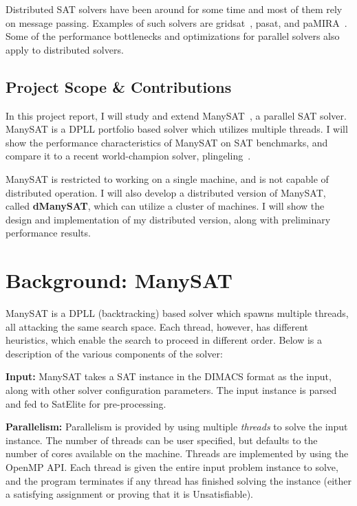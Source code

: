 \documentclass{article}
\begin{document}
Distributed SAT solvers have been around for some time and most of
them rely on message passing. Examples of such solvers are
gridsat~\cite{chrabakh2003gridsat}, pasat, and
paMIRA~\cite{schubert2005pamira}. Some of the performance bottlenecks
and optimizations for parallel solvers also apply to distributed
solvers.


\subsection{Project Scope \& Contributions}

In this project report, I will study and extend
ManySAT~\cite{manysat}, a parallel SAT solver. ManySAT is a
DPLL portfolio based solver which utilizes multiple threads. I will
show the performance characteristics of ManySAT on SAT benchmarks, and
compare it to a recent world-champion solver,
plingeling~\cite{plingeling}.


ManySAT is restricted to working on a single machine, and is not
capable of distributed operation. I will also develop a distributed
version of ManySAT, called \textbf{dManySAT}, which can utilize a cluster of
machines. I will show the design and implementation of my distributed
version, along with preliminary performance results.


\section{Background: ManySAT}

ManySAT is a DPLL (backtracking) based solver which spawns multiple
threads, all attacking the same search space. Each thread, however,
has different heuristics, which enable the search to proceed in
different order. Below is a description of the various components of the solver:

\textbf{Input: } ManySAT takes a SAT instance in the DIMACS format as
the input, along with other solver configuration parameters. The input
instance is parsed and fed to SatElite for pre-processing.


\textbf{Parallelism: } Parallelism is provided by using multiple
\emph{threads} to solve the input instance. The number of threads can
be user specified, but defaults to the number of cores available on
the machine. Threads are implemented by using the OpenMP API. Each
thread is given the entire input problem instance to solve, and the
program terminates if any thread has finished solving the instance
(either a satisfying assignment or proving that it is Unsatisfiable).
\end{document}
